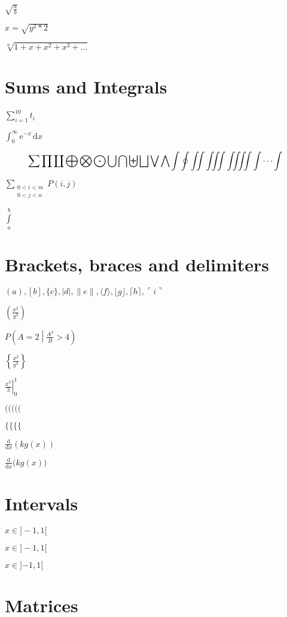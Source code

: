 \documentclass{article}
\begin{document}
$\sqrt{\frac{a}{b}}$

\(x=\sqrt{y^2*2}\)

$\sqrt[n]{1+x+x^2+x^3+\ldots}$


\section{Sums and Integrals}

$\sum_{i=1}^{10} t_i$

$\int_0^\infty \mathrm{e}^{-x}\,\mathrm{d}x$


\begin{equation}\sum  \prod  \coprod 
\bigoplus	\bigotimes	\bigodot
\bigcup		\bigcap		\biguplus
\bigsqcup		\bigvee		\bigwedge
\int		\oint		\iint
\iiint		\iiiint		\idotsint 
\end{equation}

$\sum_{\substack{
   0<i<m \\
   0<j<n
  }}
 P(i,j)$
 
$\int\limits_a^b$
 
\section{Brackets, braces and delimiters}


$
( a ), [ b ], \{ c \}, |d|, \|e\|,
\langle f \rangle, \lfloor g \rfloor,
\lceil h \rceil, \ulcorner i \urcorner
$

$\left(\frac{x^2}{y^3}\right)$

$P\left(A=2\middle|\frac{A^2}{B}>4\right)$

$\left\{\frac{x^2}{y^3}\right\}$

$\left.\frac{x^3}{3}\right|_0^1$

$( \big( \Big( \bigg( \Bigg($

$ \big\{ \Big\{ \bigg\{ \Bigg\{$

$\frac{\mathrm d}{\mathrm d x} \left( k g(x) \right)$

$\frac{\mathrm d}{\mathrm d x} \big( k g(x) \big)$

\section{Intervals}

$x \in ]-1,1[$

$x \in {]-1,1[}$

$x \in {]{-1},1[}$



\section{Matrices}
\end{document}
